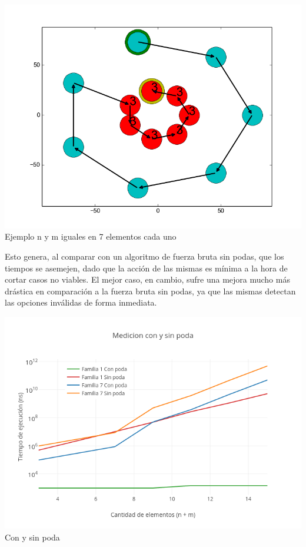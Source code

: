 \vspace*{0.3cm} \vspace*{0.3cm}
  \begin{center}
 \includegraphics[scale=0.6]{./EJ1/anilloexacto.png}
 {\\Ejemplo n y m iguales en 7 elementos cada uno}
  \end{center}
  \vspace*{0.3cm}

Esto genera, al comparar con un algoritmo de fuerza bruta sin podas, que los tiempos se asemejen, dado que la acción de las mismas es mínima a la hora de cortar casos no viables. El mejor caso, en cambio, sufre una mejora mucho más drástica en comparación a la fuerza bruta sin podas, ya que las mismas detectan las opciones inválidas de forma inmediata.

\vspace*{0.3cm} \vspace*{0.3cm}
  \begin{center}
 \includegraphics[scale=0.6]{./EJ1/fuerzabruta.png}
 {\\Con y sin poda}
  \end{center}
  \vspace*{0.3cm}
  


